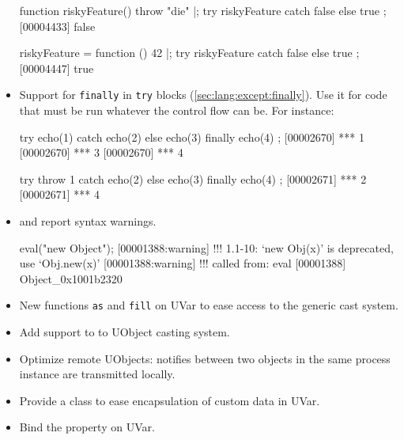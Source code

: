 \begin{itemize}
\begin{urbiscript}
function riskyFeature() { throw "die" }|;
try { riskyFeature } catch { false } else { true };
[00004433] false

riskyFeature = function () { 42 }|;
try { riskyFeature } catch { false } else { true };
[00004447] true
\end{urbiscript}

\item Support for \lstinline|finally| in \lstinline|try| blocks
  (\autoref{sec:lang:except:finally}).  Use it for code that must be run
  whatever the control flow can be.  For instance:
\begin{urbiscript}
try { echo(1) } catch { echo(2) } else { echo(3) } finally { echo(4) };
[00002670] *** 1
[00002670] *** 3
[00002670] *** 4

try { throw 1 } catch { echo(2) } else { echo(3) } finally { echo(4) };
[00002671] *** 2
[00002671] *** 4
\end{urbiscript}

\item {} and  report syntax
  warnings.
\begin{urbiscript}
eval("new Object");
[00001388:warning] !!! 1.1-10: `new Obj(x)' is deprecated, use `Obj.new(x)'
[00001388:warning] !!!    called from: eval
[00001388] Object_0x1001b2320
\end{urbiscript}
\item New functions \lstinline|as| and \lstinline|fill| on UVar to ease access
to the generic cast system.
\item Add support to  to UObject casting system.
\item Optimize remote UObjects: notifies between two objects in the same
  process instance are transmitted locally.
\item Provide a  class to ease encapsulation of custom data
  in UVar.
\item Bind the  property on UVar.
\end{itemize}


\section{}

